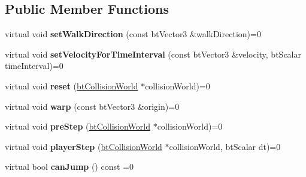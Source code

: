 \subsection*{Public Member Functions}
\begin{DoxyCompactItemize}
\item 
\mbox{\label{classbtCharacterControllerInterface_a2374fcc9c98fe90709ad9e5afb60d396}} 
virtual void {\bfseries set\+Walk\+Direction} (const bt\+Vector3 \&walk\+Direction)=0
\item 
\mbox{\label{classbtCharacterControllerInterface_af54d6770114db0a54d4875bcc62bdf0b}} 
virtual void {\bfseries set\+Velocity\+For\+Time\+Interval} (const bt\+Vector3 \&velocity, bt\+Scalar time\+Interval)=0
\item 
\mbox{\label{classbtCharacterControllerInterface_a64b6d281a9c13e523632c808437fc4b2}} 
virtual void {\bfseries reset} (\hyperlink{classbtCollisionWorld}{bt\+Collision\+World} $\ast$collision\+World)=0
\item 
\mbox{\label{classbtCharacterControllerInterface_ad62636f9204768ed9c3c9884605b4f52}} 
virtual void {\bfseries warp} (const bt\+Vector3 \&origin)=0
\item 
\mbox{\label{classbtCharacterControllerInterface_add0f49483f16c91d5ff4426515a0ad9a}} 
virtual void {\bfseries pre\+Step} (\hyperlink{classbtCollisionWorld}{bt\+Collision\+World} $\ast$collision\+World)=0
\item 
\mbox{\label{classbtCharacterControllerInterface_a36747974481cc6395c7dcab9b1f10330}} 
virtual void {\bfseries player\+Step} (\hyperlink{classbtCollisionWorld}{bt\+Collision\+World} $\ast$collision\+World, bt\+Scalar dt)=0
\item 
\mbox{\label{classbtCharacterControllerInterface_a40dbb6ac95ab3ff167f90274a1315d32}} 
virtual bool {\bfseries can\+Jump} () const =0
\item 
\mbox{\label{classbtCharacterControllerInterface_a639aa33df3cbb175e7053b64206027ab}} 

\end{DoxyCompactItemize}
